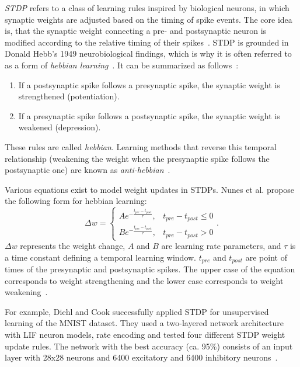 \textit{\ac{STDP}} refers to a class of learning rules inspired by biological neurons, in which synaptic weights are adjusted based on the timing of spike events.  
The core idea is, that the synaptic weight connecting a pre- and postsynaptic neuron is modified according to the relative timing of their spikes~\cite{tavanaei_deep_2019}.  
\ac{STDP} is grounded in Donald Hebb’s 1949 neurobiological findings, which is why it is often referred to as a form of \textit{hebbian learning}~\cite{nunes_spiking_2022}.  
It can be summarized as follows~\cite{ponulak_introduction_2011, nunes_spiking_2022}:
\begin{enumerate}
    \item If a postsynaptic spike follows a presynaptic spike, the synaptic weight is strengthened (potentiation).
    \item If a presynaptic spike follows a postsynaptic spike, the synaptic weight is weakened (depression).
\end{enumerate}
These rules are called \textit{hebbian}.  
Learning methods that reverse this temporal relationship (weakening the weight when the presynaptic spike follows the postsynaptic one) are known as \textit{anti-hebbian}~\cite{pietrzak_overview_2023}.  

Various equations exist to model weight updates in \acp{STDP}.  
Nunes et al. propose the following form for hebbian learning:
\begin{equation}
    \Delta w = \begin{cases}
        A e^{-\frac{t_{pre} - t_{post}}{\tau}}, & t_{pre} - t_{post} \le 0 \\
        B e^{-\frac{t_{pre} - t_{post}}{\tau}}, & t_{pre} - t_{post} > 0
    \end{cases}.
\end{equation}
\(\Delta w\) represents the weight change, \(A\) and \(B\) are learning rate parameters, and \(\tau\) is a time constant defining a temporal learning window.  
\(t_{pre}\) and \(t_{post}\) are point of times of the presynaptic and postsynaptic spikes.  
The upper case of the equation corresponds to weight strengthening and the lower case corresponds to weight weakening~\cite{nunes_spiking_2022}.

For example, Diehl and Cook successfully applied \ac{STDP} for unsupervised learning of the MNIST dataset.
They used a two-layered network architecture with \ac{LIF} neuron models, rate encoding and tested four different \ac{STDP} weight update rules.
The network with the best accuracy (ca. 95\%) consists of an input layer with 28x28 neurons and 6400 excitatory and 6400 inhibitory neurons~\cite{diehl_unsupervised_2015}.

